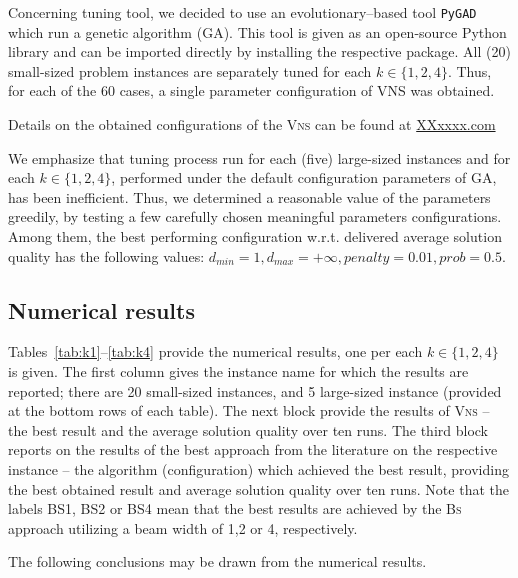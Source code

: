 \documentclass[dvipsnames,format=sigconf,anonymous=true,review=true]{acmart}
\begin{document}
   Concerning tuning tool, we decided to use an evolutionary--based tool \texttt{PyGAD} which run a genetic algorithm (GA).  This tool is given as an open-source Python library and can be imported directly by installing the respective package. All (20) small-sized problem instances are separately tuned for each $k\in \{1, 2, 4\}$. Thus, for each of the 60 cases, a single parameter configuration of VNS was obtained.
  
   Details on the obtained configurations of the \textsc{Vns} %
     can be found at \url{XXxxxx.com}
     
     We emphasize that tuning process run for each (five) large-sized instances and for each $k \in \{1,2,4\}$, performed under the default configuration parameters of GA, has been inefficient. Thus, we determined a reasonable  value of the parameters  greedily, by testing a few carefully chosen meaningful parameters configurations. Among them, the best performing configuration w.r.t. delivered average solution quality has the following values: $d_{min}=1, d_{max} = + \infty, penalty = 0.01, prob=0.5$. 

\subsection{Numerical results }
 Tables~\ref{tab:k1}--\ref{tab:k4} provide the numerical results, one per each $k \in \{1, 2,4\}$ is given. The first column gives the instance name for which the results are reported; there are 20 small-sized instances, and 5 large-sized instance (provided at the   bottom rows of each table). The next block  provide the results of \textsc{Vns} -- the best result and the average solution quality over ten runs. The third block reports on the results of the best approach from the literature on the respective instance -- the algorithm (configuration) which achieved the best result, providing the best obtained result  and average solution quality over ten runs. Note that the labels BS1, BS2 or BS4 mean  that the best results are achieved by the \textsc{Bs} approach  utilizing a beam width of 1,2 or 4, respectively. 
 
   The following conclusions may be drawn from the numerical results. 
   
\end{document}
